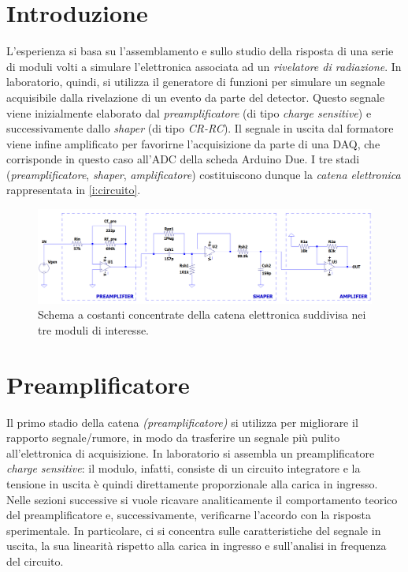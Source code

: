 \documentclass[a4paper,11pt]{article} %
\begin{document}
\section{Introduzione}\label{s:intro}

L'esperienza si basa su l'assemblamento e sullo studio della risposta di una serie di moduli volti a simulare
l'elettronica associata ad un \textit{rivelatore di radiazione}. In laboratorio, quindi, si utilizza il generatore di
funzioni per simulare un segnale acquisibile dalla rivelazione di un evento da parte del detector. Questo segnale viene
inizialmente elaborato dal \textit{preamplificatore} (di tipo \textit{charge sensitive}) e successivamente dallo
\textit{shaper} (di tipo \textit{CR-RC}). Il segnale in uscita dal formatore viene infine amplificato per favorirne
l'acquisizione da parte di una DAQ, che corrisponde in questo caso all'ADC della scheda Arduino Due. I tre stadi
(\textit{preamplificatore}, \textit{shaper}, \textit{amplificatore}) costituiscono dunque la \textit{catena elettronica}
rappresentata in \autoref{i:circuito}.
\begin{figure}[H]
	\centering
	\includegraphics[width=0.85\linewidth]{../Simulations/catena_circuito.png}
	\caption{\small Schema a costanti concentrate della catena elettronica suddivisa nei tre moduli di interesse.}
	\label{i:circuito}
\end{figure}


\section{Preamplificatore}\label{s:preamp} 

Il primo stadio della catena \textit{(preamplificatore)} si utilizza per migliorare il rapporto segnale/rumore, in modo
da trasferire un segnale più pulito all'elettronica di acquisizione. In laboratorio si assembla un preamplificatore
\textit{charge sensitive}: il modulo, infatti, consiste di un circuito integratore e la tensione in uscita è quindi
direttamente proporzionale alla carica in ingresso. Nelle sezioni successive si vuole ricavare analiticamente il
comportamento teorico del preamplificatore e, successivamente, verificarne l'accordo con la risposta sperimentale. In
particolare, ci si concentra sulle caratteristiche del segnale in uscita, la sua linearità rispetto alla carica in
ingresso e sull'analisi in frequenza del circuito.%
\end{document}
